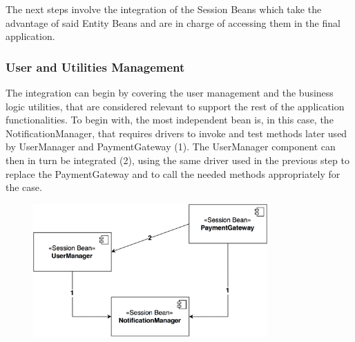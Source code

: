 \noindent
The next steps involve the integration of the Session Beans which take the advantage of said Entity Beans and are in charge of accessing them in the final application.



\subsubsection{User and Utilities Management}
The integration can begin by covering the user management and the business logic utilities, that are considered relevant to support the rest of the application functionalities. To begin with, the most independent bean is, in this case, the NotificationManager, that requires drivers to invoke and test methods later used by UserManager and PaymentGateway (1).
\noindent
The UserManager component can then in turn be integrated (2), using the same driver used in the previous step to replace the PaymentGateway and to call the needed methods appropriately for the case.

\begin{figure}[H]
\begin{center}
		\includegraphics[width=0.8\textwidth]{./integration_strategy/diagrams/user_utilities.png}
\end{center}
\end{figure}


